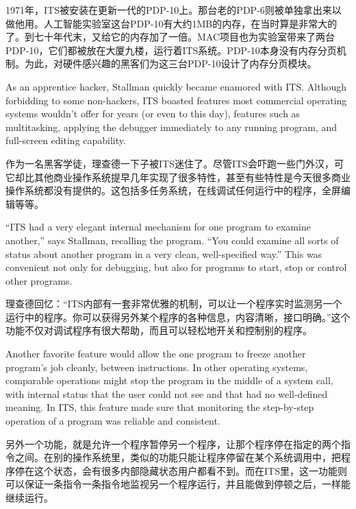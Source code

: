 \ifdefined\chs
1971年，ITS被安装在更新一代的PDP-10上。那台老的PDP-6则被单独拿出来以做他用。人工智能实验室这台PDP-10有大约1MB的内存，在当时算是非常大的了。到七十年代末，又给它的内存加了一倍。MAC项目也为实验室带来了两台PDP-10，它们都被放在大厦九楼，运行着ITS系统。PDP-10本身没有内存分页机制。为此，对硬件感兴趣的黑客们为这三台PDP-10设计了内存分页模块。
\fi

\ifdefined\eng
As an apprentice hacker, Stallman quickly became enamored with ITS. Although forbidding to some non-hackers, ITS boasted features most commercial operating systems wouldn't offer for years (or even to this day), features such as multitasking, applying the debugger immediately to any running program, and full-screen editing capability. 
\fi

\ifdefined\chs
作为一名黑客学徒，理查德一下子被ITS迷住了。尽管ITS会吓跑一些门外汉，可它却比其他商业操作系统提早几年实现了很多特性，甚至有些特性是今天很多商业操作系统都没有提供的。这包括多任务系统，在线调试任何运行中的程序，全屏编辑等等。
\fi

\ifdefined\eng
``ITS had a very elegant internal mechanism for one program to examine another,'' says Stallman, recalling the program. ``You could examine all sorts of status about another program in a very clean, well-specified way.''  This was convenient
not only for debugging, but also for programs to start, stop or control other programs.
\fi

\ifdefined\chs
理查德回忆：``ITS内部有一套非常优雅的机制，可以让一个程序实时监测另一个运行中的程序。你可以获得另外某个程序的各种信息，内容清晰，接口明确。''这个功能不仅对调试程序有很大帮助，而且可以轻松地开关和控制别的程序。
\fi

\ifdefined\eng
Another favorite feature would allow the one program to freeze another program's job cleanly, between instructions. In other operating systems, comparable operations might stop the program in the middle of a system call, with internal status that the user could not see and that had no well-defined meaning. In ITS, this feature made sure that monitoring the step-by-step operation of a program was reliable and consistent.
\fi

\ifdefined\chs
另外一个功能，就是允许一个程序暂停另一个程序，让那个程序停在指定的两个指令之间。在别的操作系统里，类似的功能只能让程序停留在某个系统调用中，把程序停在这个状态，会有很多内部隐藏状态用户都看不到。而在ITS里，这一功能则可以保证一条指令一条指令地监视另一个程序运行，并且能做到停顿之后，一样能继续运行。
\fi

